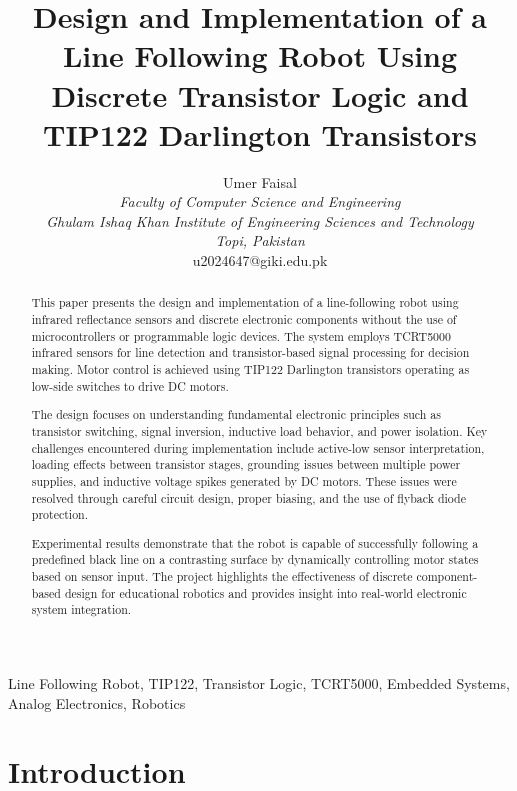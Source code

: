 \documentclass[conference]{IEEEtran}
\title{Design and Implementation of a Line Following Robot Using Discrete Transistor Logic and TIP122 Darlington Transistors}
\begin{document}
\author{
\centering
\begin{minipage}[t]{0.32\linewidth}
\centering
Umer Faisal \\
\textit{Faculty of Computer Science and Engineering \\
Ghulam Ishaq Khan Institute of Engineering Sciences and Technology \\
Topi, Pakistan} \\
u2024647@giki.edu.pk
\end{minipage}%
}

\maketitle

\begin{abstract}
This paper presents the design and implementation of a line-following robot using infrared reflectance sensors and discrete electronic components without the use of microcontrollers or programmable logic devices. The system employs TCRT5000 infrared sensors for line detection and transistor-based signal processing for decision making. Motor control is achieved using TIP122 Darlington transistors operating as low-side switches to drive DC motors.

The design focuses on understanding fundamental electronic principles such as transistor switching, signal inversion, inductive load behavior, and power isolation. Key challenges encountered during implementation include active-low sensor interpretation, loading effects between transistor stages, grounding issues between multiple power supplies, and inductive voltage spikes generated by DC motors. These issues were resolved through careful circuit design, proper biasing, and the use of flyback diode protection.

Experimental results demonstrate that the robot is capable of successfully following a predefined black line on a contrasting surface by dynamically controlling motor states based on sensor input. The project highlights the effectiveness of discrete component-based design for educational robotics and provides insight into real-world electronic system integration.
\end{abstract}

\begin{IEEEkeywords}
Line Following Robot, TIP122, Transistor Logic, TCRT5000, Embedded Systems, Analog Electronics, Robotics
\end{IEEEkeywords}

\section{Introduction}
\end{document}
